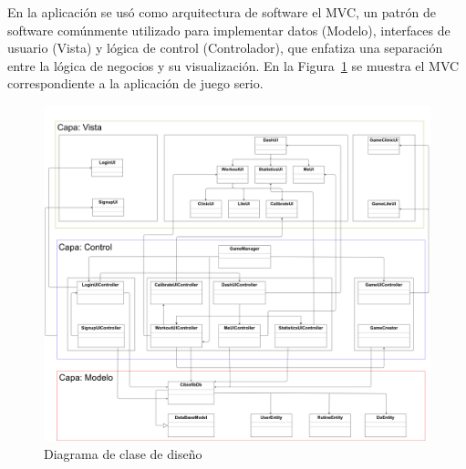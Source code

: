 En la aplicación se usó como arquitectura de software el MVC, un patrón de software comúnmente utilizado para implementar datos (Modelo), interfaces de usuario (Vista) y lógica de control (Controlador), que enfatiza una separación entre la lógica de negocios y su visualización. En la Figura~\ref{fig: software-architecture} se muestra el MVC correspondiente a la aplicación de juego serio.

\begin{figure}[ht]
    \centering
    \includegraphics[scale=0.18]{images/software-architecture.png}
    \caption{Diagrama de clase de diseño}
    \label{fig: software-architecture}
\end{figure}



